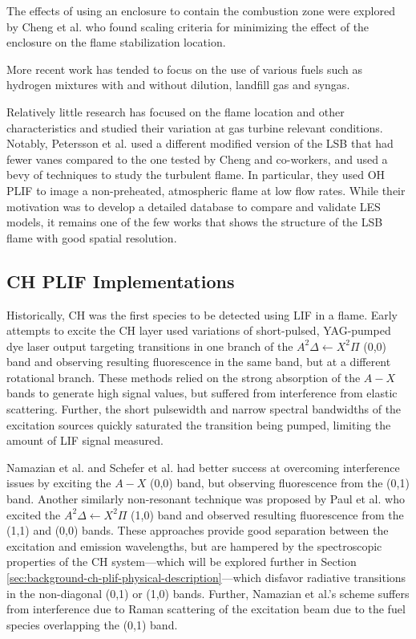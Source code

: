 The effects of using an enclosure to contain the combustion zone were explored by Cheng et al.\cite{2008-cheng-c} who found scaling criteria for minimizing the effect of the enclosure on the flame stabilization location.

More recent work has tended to focus on the use of various fuels such as hydrogen mixtures\cite{2008-cheng-b} with and without dilution\cite{2007-littlejohn}, landfill gas\cite{2008-cheng-a,2009-cheng} and syngas\cite{2010-littlejohn}.

Relatively little research has focused on the flame location and other characteristics and studied their variation at gas turbine relevant conditions.
Notably, Petersson et al.\cite{2007-petersson} used a different modified version of the LSB that had fewer vanes compared to the one tested by Cheng and co-workers, and used a bevy of techniques to study the turbulent flame.
In particular, they used OH PLIF to image a non-preheated, atmospheric flame at low flow rates.
While their motivation was to develop a detailed database to compare and validate LES models, it remains one of the few works that shows the structure of the LSB flame with good spatial resolution.

\subsection{CH PLIF Implementations}

Historically, CH was the first species to be detected using LIF in a flame.\cite{1973-barnes}
Early attempts\cite{1981-verdieck,1986-allen} to excite the CH layer used variations of short-pulsed, YAG-pumped dye laser output targeting transitions in one branch of the \(A^2\Delta\leftarrow X^2\Pi\) (0,0) band and observing resulting fluorescence in the same band, but at a different rotational branch.
These methods relied on the strong absorption of the \(A-X\) bands to generate high signal values, but suffered from interference from elastic scattering.
Further, the short pulsewidth and narrow spectral bandwidths of the excitation sources quickly saturated the transition being pumped, limiting the amount of LIF signal measured.

Namazian et al.\cite{1986-namazian} and Schefer et al.\cite{1994-schefer} had better success at overcoming interference issues by exciting the \(A-X\) (0,0) band, but observing fluorescence from the (0,1) band.
Another similarly non-resonant technique was proposed by Paul et al.\cite{1994-paul} who excited the \(A^2\Delta\leftarrow X^2\Pi\) (1,0) band and observed resulting fluorescence from the (1,1) and (0,0) bands.
These approaches provide good separation between the excitation and emission wavelengths, but are hampered by the spectroscopic properties of the CH system---which will be explored further in Section \ref{sec:background-ch-plif-physical-description}---which disfavor radiative transitions in the non-diagonal (0,1) or (1,0) bands.
Further, Namazian et al.'s scheme suffers from interference due to Raman scattering of the excitation beam due to the fuel species overlapping the (0,1) band.

